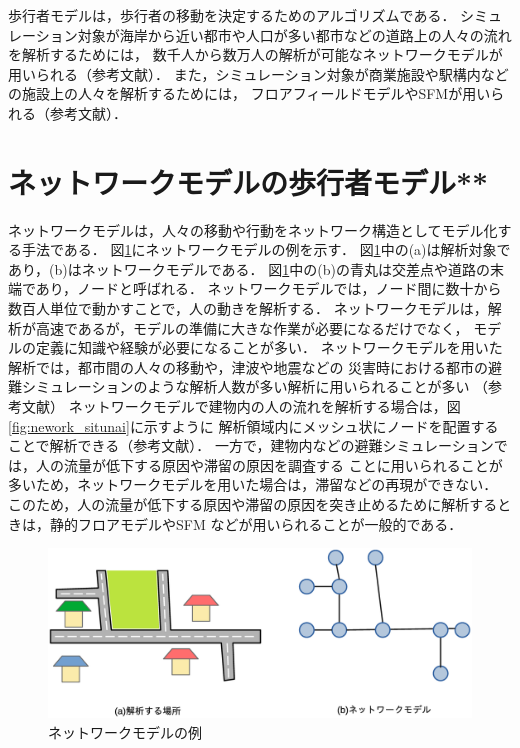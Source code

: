 歩行者モデルは，歩行者の移動を決定するためのアルゴリズムである．
シミュレーション対象が海岸から近い都市や人口が多い都市などの道路上の人々の流れを解析するためには，
数千人から数万人の解析が可能なネットワークモデルが用いられる（参考文献）．
また，シミュレーション対象が商業施設や駅構内などの施設上の人々を解析するためには，
フロアフィールドモデルやSFMが用いられる（参考文献）．
\fi

\section{ネットワークモデルの歩行者モデル**}
ネットワークモデルは，人々の移動や行動をネットワーク構造としてモデル化する手法である．
図\ref{fig:network_ex}にネットワークモデルの例を示す．
図\ref{fig:network_ex}中の(a)は解析対象であり，(b)はネットワークモデルである．
図\ref{fig:network_ex}中の(b)の青丸は交差点や道路の末端であり，ノードと呼ばれる．
ネットワークモデルでは，ノード間に数十から数百人単位で動かすことで，人の動きを解析する．
ネットワークモデルは，解析が高速であるが，モデルの準備に大きな作業が必要になるだけでなく，
モデルの定義に知識や経験が必要になることが多い．
ネットワークモデルを用いた解析では，都市間の人々の移動や，津波や地震などの
災害時における都市の避難シミュレーションのような解析人数が多い解析に用いられることが多い
（参考文献）
ネットワークモデルで建物内の人の流れを解析する場合は，図\ref{fig:nework_situnai}に示すように
解析領域内にメッシュ状にノードを配置することで解析できる（参考文献）．
一方で，建物内などの避難シミュレーションでは，人の流量が低下する原因や滞留の原因を調査する
ことに用いられることが多いため，ネットワークモデルを用いた場合は，滞留などの再現ができない．
このため，人の流量が低下する原因や滞留の原因を突き止めるために解析するときは，静的フロアモデルやSFM
などが用いられることが一般的である．


%
\begin{figure}[h]
    \begin{center}
     \includegraphics[width=14cm,clip]{figure/networkmodel_ex.eps}
     \caption{ネットワークモデルの例}
     \label{fig:network_ex}
    \end{center}
\end{figure}
%
\clearpage
